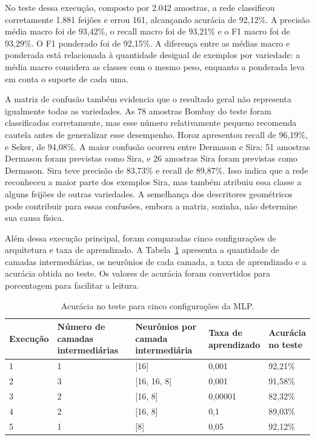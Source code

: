 \documentclass[12pt]{article}
\begin{document}
No teste dessa execução, composto por 2.042 amostras, a rede classificou corretamente 1.881 feijões e errou 161, alcançando acurácia de 92,12\%. A precisão média macro foi de 93,42\%, o recall macro foi de 93,21\% e o F1 macro foi de 93,29\%. O F1 ponderado foi de 92,15\%. A diferença entre as médias macro e ponderada está relacionada à quantidade desigual de exemplos por variedade: a média macro considera as classes com o mesmo peso, enquanto a ponderada leva em conta o suporte de cada uma.

A matriz de confusão também evidencia que o resultado geral não representa igualmente todas as variedades. As 78 amostras Bombay do teste foram classificadas corretamente, mas esse número relativamente pequeno recomenda cautela antes de generalizar esse desempenho. Horoz apresentou recall de 96,19\%, e Seker, de 94,08\%. A maior confusão ocorreu entre Dermason e Sira: 51 amostras Dermason foram previstas como Sira, e 26 amostras Sira foram previstas como Dermason. Sira teve precisão de 83,73\% e recall de 89,87\%. Isso indica que a rede reconheceu a maior parte dos exemplos Sira, mas também atribuiu essa classe a alguns feijões de outras variedades. A semelhança dos descritores geométricos pode contribuir para essas confusões, embora a matriz, sozinha, não determine sua causa física.

Além dessa execução principal, foram comparadas cinco configurações de arquitetura e taxa de aprendizado. A Tabela~\ref{tab:experimentos} apresenta a quantidade de camadas intermediárias, os neurônios de cada camada, a taxa de aprendizado e a acurácia obtida no teste. Os valores de acurácia foram convertidos para porcentagem para facilitar a leitura.

\begin{table}[ht]
\centering
\caption{Acurácia no teste para cinco configurações da MLP.}
\label{tab:experimentos}
\small
\setlength{\tabcolsep}{3pt}
\begin{tabular}{|p{1.25cm}|p{2.35cm}|p{3.25cm}|p{2.35cm}|p{3.15cm}|}
\hline
Execução & \shortstack{Número de\\camadas intermediárias} &
\shortstack{Neurônios por\\camada intermediária} &
\shortstack{Taxa de\\aprendizado} &
\shortstack{Acurácia\\no teste} \\
\hline
\rule{0pt}{2.5ex}1 & 1 & [16] & 0,001 & 92,21\% \\
\hline
\rule{0pt}{2.5ex}2 & 3 & [16, 16, 8] & 0,001 & 91,58\% \\
\hline
\rule{0pt}{2.5ex}3 & 2 & [16, 8] & 0,00001 & 82,32\% \\
\hline
\rule{0pt}{2.5ex}4 & 2 & [16, 8] & 0,1 & 89,03\% \\
\hline
\rule{0pt}{2.5ex}5 & 1 & [8] & 0,05 & 92,12\% \\
\hline
\end{tabular}
\end{table}
\end{document}
